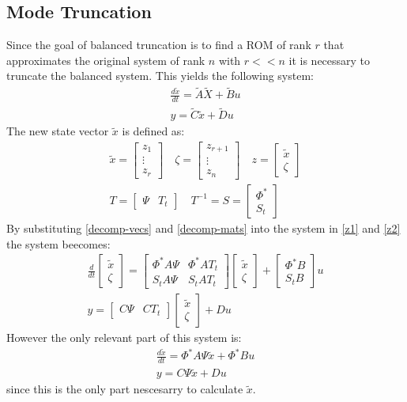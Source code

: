 \subsection{Mode Truncation}
Since the goal of balanced truncation is to find a ROM of rank \(r\) that approximates the original system of rank \(n\) with \(r << n\) it is necessary to truncate the balanced system.
This yields the following system:
\begin{gather}
\frac{d\tilde{x}}{dt} = \tilde{A}\tilde{X} + \tilde{B}u \\
y = \tilde{C}\tilde{x} + \tilde{D}u
\end{gather}
The new state vector \(\tilde{x}\) is defined as:
\begin{gather}
\tilde{x} = \begin{bmatrix}
z_1 \\
\vdots \\
z_r
\end{bmatrix} \quad 
\zeta = \begin{bmatrix}
z_{r+1} \\
\vdots \\
z_n
\end{bmatrix} \quad
z = \begin{bmatrix}
\tilde{x} \\
\zeta
\end{bmatrix} \label{decomp-vecs}\\
T = \begin{bmatrix}
\Psi & T_t
\end{bmatrix} \quad
T^{-1} = S = \begin{bmatrix}
\Phi^{*} \\
S_t
\end{bmatrix} \label{decomp-mats}
\end{gather}
By substituting \ref{decomp-vecs} and \ref{decomp-mats} into the system in \ref{z1} and \ref{z2} the system beecomes:
\begin{gather}
\frac{d}{dt} \begin{bmatrix}
\tilde{x} \\
\zeta
\end{bmatrix} = \begin{bmatrix}
\Phi^{*}A\Psi & \Phi^{*}AT_t \\
S_tA\Psi & S_tAT_t
\end{bmatrix} \begin{bmatrix}
\tilde{x} \\
\zeta
\end{bmatrix}
+ \begin{bmatrix}
\Phi^{*}B \\
S_tB
\end{bmatrix} u \\
y = \begin{bmatrix}
C \Psi & CT_t
\end{bmatrix} \begin{bmatrix}
\tilde{x} \\
\zeta
\end{bmatrix} + Du
\end{gather}
However the only relevant part of this system is:
\begin{gather}
\frac{d\tilde{x}}{dt} = \Phi^{*}A\Psi\tilde{x} + \Phi^{*}Bu \\
y = C\Psi\tilde{x} + Du 
\end{gather}
since this is the only part nescesarry to calculate \(\tilde{x}\).
\cite{brunton_kutz_2019e}

